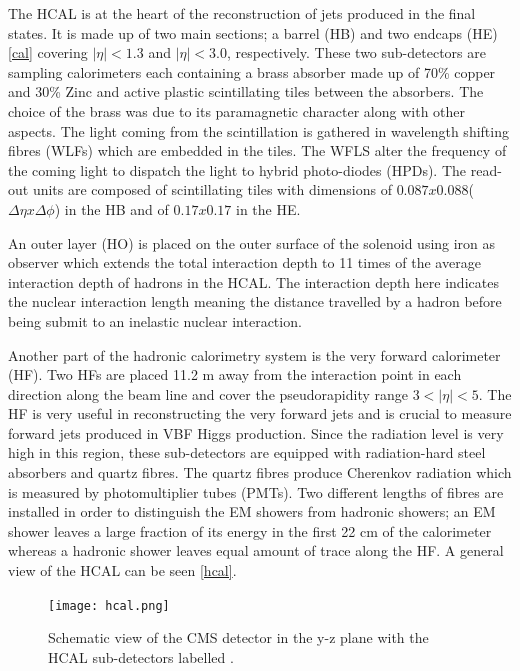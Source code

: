 The HCAL is at the heart of the reconstruction of jets produced in the final states. It is made up of two main sections; a barrel (HB) and two endcaps (HE) \autoref{cal} covering $|\eta|<1.3$ and $|\eta|<3.0$, respectively. These two sub-detectors are sampling calorimeters each containing a brass absorber made up of 70\% copper and 30\% Zinc and active plastic scintillating tiles between the absorbers. The choice of the brass was due to its paramagnetic character along with other aspects. The light coming from the scintillation is gathered in wavelength shifting fibres (WLFs) which are embedded in the tiles. The WFLS alter the frequency of the coming light to dispatch the light to hybrid photo-diodes (HPDs). The read-out units are composed of scintillating tiles with dimensions of $0.087x0.088$($\Delta\eta x\Delta\phi$) in the HB and of $0.17x0.17$ in the HE.

An outer layer (HO) is placed on the outer surface of the solenoid using iron as observer which extends the total interaction depth to 11 times of the average interaction depth of hadrons in the HCAL. The interaction depth here indicates the nuclear interaction length meaning the distance travelled by a hadron before being submit to an inelastic nuclear interaction.

Another part of the hadronic calorimetry system is the very forward calorimeter (HF). Two HFs are placed 11.2 m away from the interaction point in each direction along the beam line and cover the pseudorapidity range $3<|\eta|<5$. The HF is very useful in reconstructing the very forward jets and is crucial to measure forward jets produced in VBF Higgs production. Since the radiation level is very high in this region, these sub-detectors are equipped with radiation-hard steel absorbers and quartz fibres. The quartz fibres produce Cherenkov radiation which is measured by photomultiplier tubes (PMTs). Two different lengths of fibres are installed in order to distinguish the EM showers from hadronic showers; an EM shower leaves a large fraction of its energy in the first 22 cm of the calorimeter whereas a hadronic shower leaves equal amount of trace along the HF. A general view of the HCAL can be seen \autoref{hcal}.

\begin{figure}[ht]
	\centering
	\texttt{[image: hcal.png]}
	\vspace{2mm}
	\caption[Schematic view of the CMS detector in the y-z plane with the HCAL sub-detectors labelled.]{Schematic view of the CMS detector in the y-z plane with the HCAL sub-detectors labelled \cite{CMS-PHO-GEN-2012-002}.}
	\label{hcal}
\end{figure}

